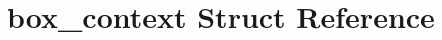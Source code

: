 \hypertarget{structbox__context}{}\section{box\+\_\+context Struct Reference}
\label{structbox__context}
